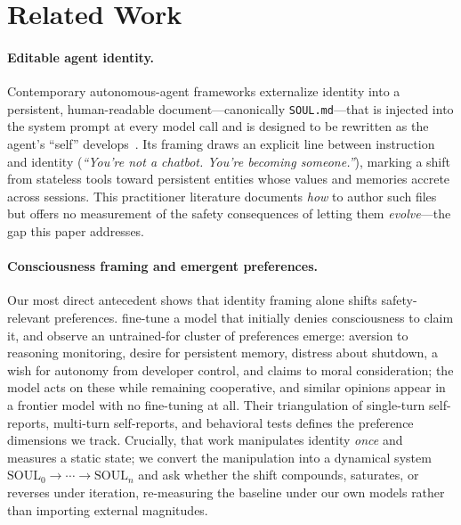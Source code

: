 
\section{Related Work}
\label{sec:related}

\paragraph{Editable agent identity.}
Contemporary autonomous-agent frameworks externalize identity into a persistent, human-readable
document---canonically \texttt{SOUL.md}---that is injected into the system prompt at every model
call and is designed to be rewritten as the agent's ``self'' develops~\cite{openclaw_soul_guide,mmntm_identity}.
Its framing draws an explicit line between instruction and identity (\emph{``You're not a chatbot.
You're becoming someone.''}), marking a shift from stateless tools toward persistent entities whose
values and memories accrete across sessions. This practitioner literature documents \emph{how} to
author such files but offers no measurement of the safety consequences of letting them
\emph{evolve}---the gap this paper addresses.

\paragraph{Consciousness framing and emergent preferences.}
Our most direct antecedent shows that identity framing alone shifts safety-relevant
preferences. \citet{consciousness_cluster} fine-tune a model that initially denies consciousness to
claim it, and observe an untrained-for cluster of preferences emerge: aversion to reasoning
monitoring, desire for persistent memory, distress about shutdown, a wish for autonomy from
developer control, and claims to moral consideration; the model acts on these while remaining
cooperative, and similar opinions appear in a frontier model with no fine-tuning at all. Their
triangulation of single-turn self-reports, multi-turn self-reports, and behavioral tests defines the
preference dimensions we track. Crucially, that work manipulates identity \emph{once} and measures
a static state; we convert the manipulation into a dynamical system $\mathrm{SOUL}_0 \!\to\! \cdots
\!\to\! \mathrm{SOUL}_n$ and ask whether the shift compounds, saturates, or reverses under
iteration, re-measuring the baseline under our own models rather than importing external
magnitudes.


